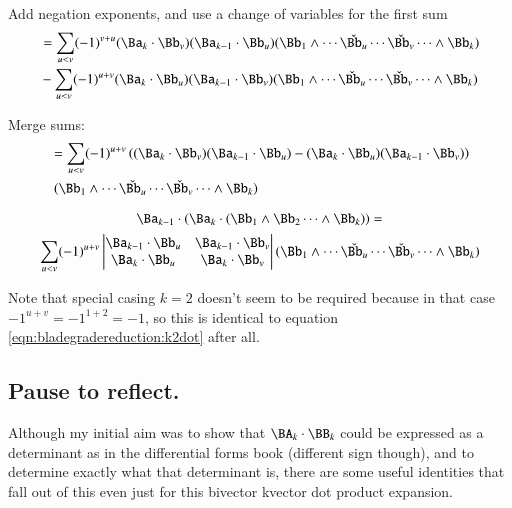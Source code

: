 Add negation exponents, and use a change of variables for the first sum
\begin{align*}
&= \sum_{u<v} (-1)^{v+u} (\Ba_k \cdot \Bb_v) (\Ba_{k-1} \cdot \Bb_u) (\Bb_1 \wedge \cdots \check{\Bb_u} \cdots \check{\Bb_v} \cdots \wedge \Bb_k) \\
&- \sum_{u<v} (-1)^{u+v} (\Ba_k \cdot \Bb_u) (\Ba_{k-1} \cdot \Bb_v) (\Bb_1 \wedge \cdots \check{\Bb_u} \cdots \check{\Bb_v} \cdots \wedge \Bb_k) \\
\end{align*}

Merge sums:
\begin{align*}
&= \sum_{u<v} (-1)^{u+v} 
\left(
(\Ba_k \cdot \Bb_v) (\Ba_{k-1} \cdot \Bb_u)
-(\Ba_k \cdot \Bb_u) (\Ba_{k-1} \cdot \Bb_v)
\right) \\
& \; (\Bb_1 \wedge \cdots \check{\Bb_u} \cdots \check{\Bb_v} \cdots \wedge \Bb_k)
\end{align*}

\begin{equation}\label{eqn:bladegradereduction:bivectordotkvector}
\Ba_{k-1} \cdot (\Ba_k \cdot (\Bb_1 \wedge \Bb_2 \cdots \wedge \Bb_k))
= 
\end{equation}
\begin{equation*}
\sum_{u<v} (-1)^{u+v} 
\begin{vmatrix}
\Ba_{k-1} \cdot \Bb_u & \Ba_{k-1} \cdot \Bb_v \\
\Ba_k \cdot \Bb_u & \Ba_k \cdot \Bb_v \\
\end{vmatrix}
(\Bb_1 \wedge \cdots \check{\Bb_u} \cdots \check{\Bb_v} \cdots \wedge \Bb_k) \\
\end{equation*}

Note that special casing $k=2$ doesn't seem to be required because in that
case $-1^{u+v} = -1^{1+2}=-1$, so this is identical to 
equation \ref{eqn:bladegradereduction:k2dot} after all.

\subsection{Pause to reflect. }

Although my initial aim was to show that $\BA_k \cdot \BB_k$ could be
expressed as a determinant as in the differential forms book (different
sign though), and to determine exactly what that determinant is, there
are some useful identities that fall out of this even just for this
bivector kvector dot product expansion.

